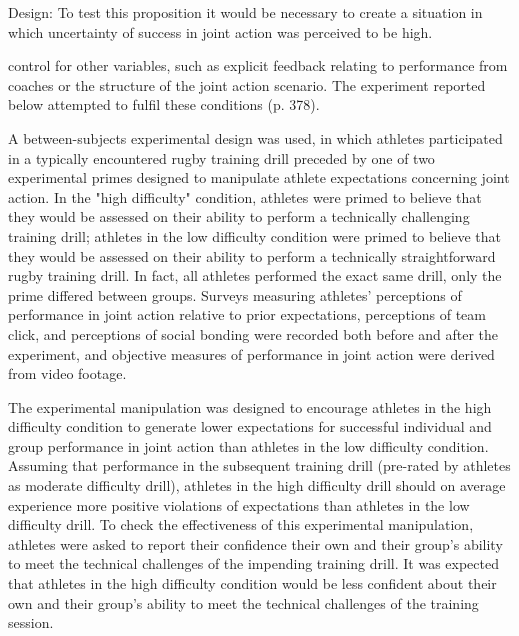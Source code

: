 Design:
To test this proposition it would be necessary to create a situation in which uncertainty of success in joint action was perceived to be high.

control for other variables, such as explicit feedback relating to performance from coaches or the structure of the joint action scenario.
The experiment reported below attempted to fulfil these conditions (p. 378).

A between-subjects experimental design was used, in which athletes participated in a typically encountered rugby training drill preceded by one of two experimental primes designed to manipulate athlete expectations concerning joint action.  In the "high difficulty" condition, athletes were primed to believe that they would be assessed on their ability to perform a technically challenging training drill; athletes in the low difficulty condition were primed to believe that they would be assessed on their ability to perform a technically straightforward rugby training drill. In fact, all athletes performed the exact same drill, only the prime differed between groups.  Surveys measuring athletes' perceptions of performance in joint action relative to prior expectations, perceptions of team click, and perceptions of social bonding were recorded both before and after the experiment, and objective measures of performance in joint action were derived from video footage.

The experimental manipulation was designed to encourage athletes in the high difficulty condition to generate lower expectations for successful individual and group performance in joint action than athletes in the low difficulty condition.  Assuming that performance in the subsequent training drill (pre-rated by athletes as moderate difficulty drill), athletes in the high difficulty drill should on average experience more positive violations of expectations than athletes in the low difficulty drill.  To check the effectiveness of this experimental manipulation, athletes were asked to report their confidence their own and their group’s ability to meet the technical challenges of the impending training drill.  It was expected that athletes in the high difficulty condition would be less confident about their own and their group's ability to meet the technical challenges of the training session.




